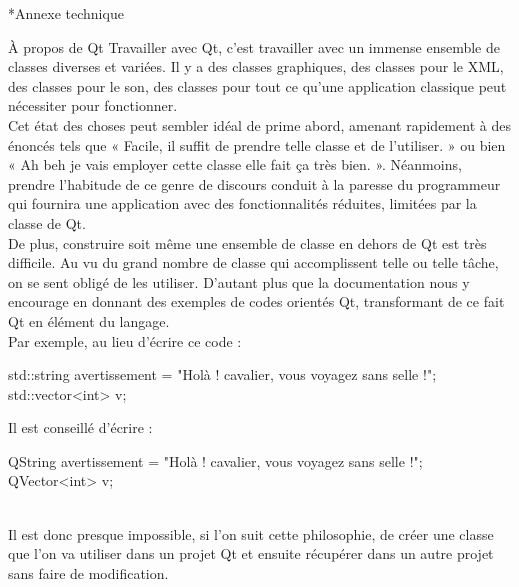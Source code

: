 \documentclass[a4paper, 12pt]{report}
\begin{document}
	\begin{chapter}*{Annexe technique}
	\label{annexe}
	\begin{section}{À propos de Qt}
			Travailler avec \gls{Qt}, c'est travailler avec un immense ensemble de classes diverses et variées. 
			Il y a des classes graphiques, des classes pour le XML, des classes pour le son, des classes pour tout ce qu'une application classique
			peut nécessiter pour fonctionner.\\

			Cet état des choses peut sembler idéal de prime abord, amenant rapidement à des énoncés tels que « Facile, il suffit de prendre telle classe
			et de l'utiliser. » ou bien « Ah beh je vais employer cette classe elle fait ça très bien. ». Néanmoins, prendre l'habitude de ce genre de 
			discours conduit à la paresse du programmeur qui fournira une application avec des fonctionnalités réduites,
			limitées par la classe de \gls{Qt}.\\

			De plus, construire soit même une ensemble de classe en dehors de \gls{Qt} est très difficile. Au vu du grand nombre de classe qui
			accomplissent telle ou telle tâche, on se sent obligé de les utiliser. D'autant plus que la documentation nous y encourage en donnant des exemples de codes orientés \gls{Qt}, transformant de ce fait \gls{Qt} en élément du langage.\\

			\noindent
			Par exemple, au lieu d'écrire ce code : 
			\begin{center}
			\begin{cppcode}
std::string avertissement = "Holà ! cavalier, vous voyagez sans selle !";
std::vector<int> v;
			\end{cppcode}
			\end{center}
			Il est conseillé d'écrire : 
			\begin{center}
			\begin{cppcode}
QString avertissement = "Holà ! cavalier, vous voyagez sans selle !";
QVector<int> v;
			\end{cppcode}
			\end{center}~\\

			Il est donc presque impossible, si l'on suit cette philosophie, de créer une classe que l'on va utiliser dans un projet \gls{Qt} et 
			ensuite récupérer dans un autre projet sans faire de modification.\\


\end{section}
\end{chapter}
\end{document}
